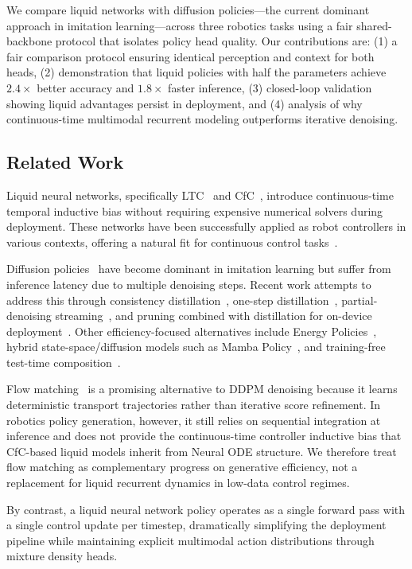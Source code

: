 \documentclass{article}
\begin{document}
We compare liquid networks with diffusion policies---the current dominant approach in imitation learning---across three robotics tasks using a fair shared-backbone protocol that isolates policy head quality. Our contributions are: (1) a fair comparison protocol ensuring identical perception and context for both heads, (2) demonstration that liquid policies with half the parameters achieve $2.4\times$ better accuracy and $1.8\times$ faster inference, (3) closed-loop validation showing liquid advantages persist in deployment, and (4) analysis of why continuous-time multimodal recurrent modeling outperforms iterative denoising.

\subsection{Related Work}
Liquid neural networks, specifically LTC~\cite{hasani2021ltc} and CfC~\cite{hasani2022cfc}, introduce continuous-time temporal inductive bias without requiring expensive numerical solvers during deployment. These networks have been successfully applied as robot controllers in various contexts, offering a natural fit for continuous control tasks~\cite{hasani2021ltc}.

Diffusion policies~\cite{chi2023diffusion,ho2020ddpm} have become dominant in imitation learning but suffer from inference latency due to multiple denoising steps. Recent work attempts to address this through consistency distillation~\cite{prasad2024consistency}, one-step distillation~\cite{wang2024onedp}, partial-denoising streaming~\cite{hoeg2024sdp}, and pruning combined with distillation for on-device deployment~\cite{wu2025lightdp}. Other efficiency-focused alternatives include Energy Policies~\cite{jia2025energy}, hybrid state-space/diffusion models such as Mamba Policy~\cite{cao2024mamba}, and training-free test-time composition~\cite{cao2025gpc}.

Flow matching~\cite{lipman2023flowmatching} is a promising alternative to DDPM denoising because it learns deterministic transport trajectories rather than iterative score refinement. In robotics policy generation, however, it still relies on sequential integration at inference and does not provide the continuous-time controller inductive bias that CfC-based liquid models inherit from Neural ODE structure. We therefore treat flow matching as complementary progress on generative efficiency, not a replacement for liquid recurrent dynamics in low-data control regimes.

By contrast, a liquid neural network policy operates as a single forward pass with a single control update per timestep, dramatically simplifying the deployment pipeline while maintaining explicit multimodal action distributions through mixture density heads.
\end{document}
